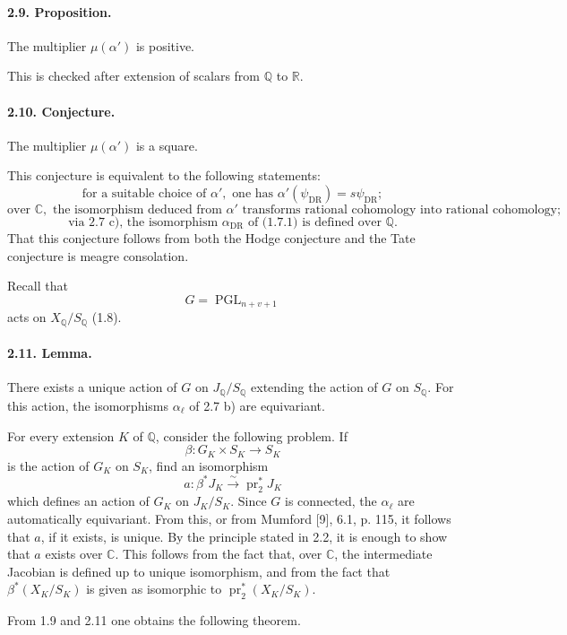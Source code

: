 \documentclass[10pt]{article}
\newcommand{\C}{\mathbb C}
\newcommand{\Q}{\mathbb Q}
\newcommand{\R}{\mathbb R}
\newcommand{\DR}{\mathrm{DR}}
\newcommand{\PGL}{\operatorname{PGL}}
\newcommand{\iso}{\xrightarrow{\sim}}
\begin{document}
\paragraph{2.9. Proposition.} The multiplier \(\mu(\alpha')\) is positive.

This is checked after extension of scalars from \(\Q\) to \(\R\).

\paragraph{2.10. Conjecture.} The multiplier \(\mu(\alpha')\) is a square.

This conjecture is equivalent to the following statements:
\[
\tag{2.10.1}
\text{for a suitable choice of }\alpha',\text{ one has }\alpha'(\psi_{\DR})=s\psi_{\DR};
\]
\[
\tag{2.10.2}
\text{over }\C,\text{ the isomorphism deduced from }\alpha'\text{ transforms rational cohomology into rational cohomology;}
\]
\[
\tag{2.10.3}
\text{via 2.7 c), the isomorphism }\alpha_{\DR}\text{ of (1.7.1) is defined over }\Q.
\]
That this conjecture follows from both the Hodge conjecture and the Tate conjecture is meagre consolation.

Recall that
\[
G=\PGL_{n+v+1}
\]
acts on \(X_\Q/S_\Q\) (1.8).

\paragraph{2.11. Lemma.} There exists a unique action of \(G\) on \(J_\Q/S_\Q\) extending the action of \(G\) on \(S_\Q\). For this action, the isomorphisms \(\alpha_\ell\) of 2.7 b) are equivariant.

For every extension \(K\) of \(\Q\), consider the following problem. If
\[
\beta:G_K\times S_K\longrightarrow S_K
\]
is the action of \(G_K\) on \(S_K\), find an isomorphism
\[
a:\beta^*J_K\iso \operatorname{pr}_2^*J_K
\]
which defines an action of \(G_K\) on \(J_K/S_K\). Since \(G\) is connected, the \(\alpha_\ell\) are automatically equivariant. From this, or from Mumford [9], 6.1, p. 115, it follows that \(a\), if it exists, is unique. By the principle stated in 2.2, it is enough to show that \(a\) exists over \(\C\). This follows from the fact that, over \(\C\), the intermediate Jacobian is defined up to unique isomorphism, and from the fact that \(\beta^*(X_K/S_K)\) is given as isomorphic to \(\operatorname{pr}_2^*(X_K/S_K)\).

From 1.9 and 2.11 one obtains the following theorem.
\end{document}
